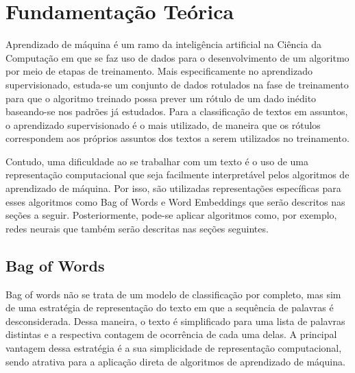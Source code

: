 \chapter{Fundamentação Teórica}
\label{cap:methods}
\noindent

Aprendizado de máquina é um ramo da inteligência artificial na Ciência da Computação em que se faz uso de dados para o desenvolvimento de um algoritmo por meio de etapas de treinamento. Mais especificamente no aprendizado supervisionado, estuda-se um conjunto de dados rotulados na fase de treinamento para que o algoritmo treinado possa prever um rótulo de um dado inédito baseando-se nos padrões já estudados. Para a classificação de textos em assuntos, o aprendizado supervisionado é o mais utilizado, de maneira que os rótulos correspondem aos próprios assuntos dos textos a serem utilizados no treinamento.

Contudo, uma dificuldade ao se trabalhar com um texto é o uso de uma representação computacional que seja facilmente interpretável pelos algoritmos de aprendizado de máquina. Por isso, são utilizadas representações específicas para esses algoritmos como Bag of Words e Word Embeddings que serão descritos nas seções a seguir. Posteriormente, pode-se aplicar algoritmos como, por exemplo, redes neurais que também serão descritas nas seções seguintes.

\section{Bag of Words}

Bag of words não se trata de um modelo de classificação por completo, mas sim de uma estratégia de representação do texto em que a sequência de palavras é desconsiderada. Dessa maneira, o texto é simplificado para uma lista de palavras distintas e a respectiva contagem de ocorrência de cada uma delas. A principal vantagem dessa estratégia é a sua simplicidade de representação computacional, sendo atrativa para a aplicação direta de algoritmos de aprendizado de máquina.

